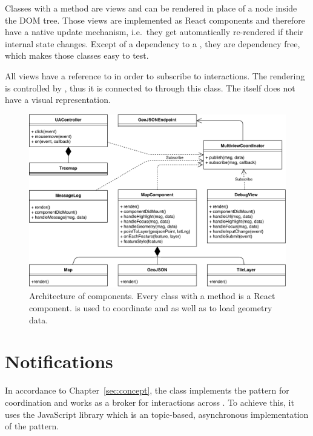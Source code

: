 Classes with a  method are views and can be rendered in place of a node inside the DOM tree.
Those views are implemented as React components and therefore have a native update mechanism, i.e.\ they get automatically re-rendered if their internal state changes.
Except of a dependency to a , they are dependency free, which makes those classes easy to test.

All views have a reference to  in order to subscribe to interactions.
The rendering \tmap{} is controlled by , thus it is connected to  through this class.
The  itself does not have a visual representation.

\begin{figure}[ht]
  \centering
  \caption{%
    Architecture of components.
    Every class with a  method is a React component.
     is used to coordinate \tmap{} and \gv{} as well as to load geometry data.
  }\label{fig:implementation:architecture}
  \includegraphics[width=\textwidth]{figures/implementation/Architecture.pdf}
\end{figure}

\section{Notifications}

In accordance to Chapter~\ref{sec:concept}, the class  implements the  pattern for coordination and works as a broker for interactions across \cmvs{}.
To achieve this, it uses the JavaScript library  which is an topic-based, asynchronous implementation of the pattern.


